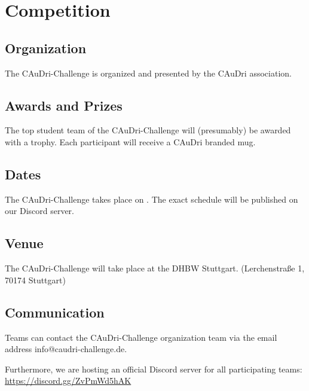 \chapter{Competition}

\section{Organization}

The CAuDri-Challenge is organized and presented by the CAuDri association.

\section{Awards and Prizes}

The top student team of the CAuDri-Challenge will (presumably) be awarded with
a trophy. Each participant will receive a CAuDri branded mug.

\section{Dates}

The CAuDri-Challenge \yearofchallenge takes place on \dateofchallenge. The exact schedule will be
published on our Discord server.

\section{Venue}

The CAuDri-Challenge will take place at the DHBW Stuttgart. (Lerchenstraße 1,
70174 Stuttgart)

\section{Communication}

Teams can contact the CAuDri-Challenge organization team via the email address
info@caudri-challenge.de.

Furthermore, we are hosting an official Discord server for all participating
teams:\\ \href{https://discord.gg/ZvPmWd5hAK}{https://discord.gg/ZvPmWd5hAK}